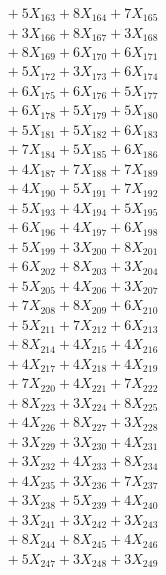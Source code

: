 \documentclass[a4paper,10pt]{article}
\begin{document}
{\begin{align}
&\;  + 5 X_{163} + 8 X_{164} + 7 X_{165} \\[0.3ex]
&\;  + 3 X_{166} + 8 X_{167} + 3 X_{168} \\[0.3ex]
&\;  + 8 X_{169} + 6 X_{170} + 6 X_{171} \\[0.3ex]
&\;  + 5 X_{172} + 3 X_{173} + 6 X_{174} \\[0.3ex]
&\;  + 6 X_{175} + 6 X_{176} + 5 X_{177} \\[0.3ex]
&\;  + 6 X_{178} + 5 X_{179} + 5 X_{180} \\[0.3ex]
&\;  + 5 X_{181} + 5 X_{182} + 6 X_{183} \\[0.3ex]
&\;  + 7 X_{184} + 5 X_{185} + 6 X_{186} \\[0.3ex]
&\;  + 4 X_{187} + 7 X_{188} + 7 X_{189} \\[0.5ex]\allowbreak
&\;  + 4 X_{190} + 5 X_{191} + 7 X_{192} \\[0.3ex]
&\;  + 5 X_{193} + 4 X_{194} + 5 X_{195} \\[0.3ex]
&\;  + 6 X_{196} + 4 X_{197} + 6 X_{198} \\[0.3ex]
&\;  + 5 X_{199} + 3 X_{200} + 8 X_{201} \\[0.3ex]
&\;  + 6 X_{202} + 8 X_{203} + 3 X_{204} \\[0.3ex]
&\;  + 5 X_{205} + 4 X_{206} + 3 X_{207} \\[0.3ex]
&\;  + 7 X_{208} + 8 X_{209} + 6 X_{210} \\[0.3ex]
&\;  + 5 X_{211} + 7 X_{212} + 6 X_{213} \\[0.3ex]
&\;  + 8 X_{214} + 4 X_{215} + 4 X_{216} \\[0.3ex]
&\;  + 4 X_{217} + 4 X_{218} + 4 X_{219} \\[0.5ex]\allowbreak
&\;  + 7 X_{220} + 4 X_{221} + 7 X_{222} \\[0.3ex]
&\;  + 8 X_{223} + 3 X_{224} + 8 X_{225} \\[0.3ex]
&\;  + 4 X_{226} + 8 X_{227} + 3 X_{228} \\[0.3ex]
&\;  + 3 X_{229} + 3 X_{230} + 4 X_{231} \\[0.3ex]
&\;  + 3 X_{232} + 4 X_{233} + 8 X_{234} \\[0.3ex]
&\;  + 4 X_{235} + 3 X_{236} + 7 X_{237} \\[0.3ex]
&\;  + 3 X_{238} + 5 X_{239} + 4 X_{240} \\[0.3ex]
&\;  + 3 X_{241} + 3 X_{242} + 3 X_{243} \\[0.3ex]
&\;  + 8 X_{244} + 8 X_{245} + 4 X_{246} \\[0.3ex]
&\;  + 5 X_{247} + 3 X_{248} + 3 X_{249} \\[0.5ex]\allowbreak

\end{align}}
\end{document}

